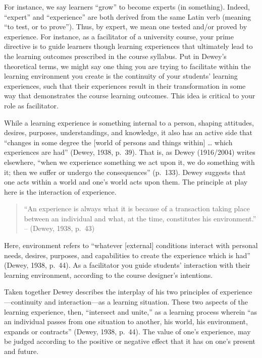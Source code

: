 \documentclass[
]{book}
\begin{document}
For instance, we say learners ``grow'' to become experts (in something). Indeed, ``expert'' and ``experience'' are both derived from the same Latin verb (meaning ``to test, or to prove''). Thus, by expert, we mean one tested and/or proved by experience. For instance, as a facilitator of a university course, your prime directive is to guide learners though learning experiences that ultimately lead to the learning outcomes prescribed in the course syllabus. Put in Dewey's theoretical terms, we might say one thing you are trying to facilitate within the learning environment you create is the continuity of your students' learning experiences, such that their experiences result in their transformation in some way that demonstrates the course learning outcomes. This idea is critical to your role as facilitator.

While a learning experience is something internal to a person, shaping attitudes, desires, purposes, understandings, and knowledge, it also has an active side that ``changes in some degree the {[}world of persons and things within{]} \ldots{} which experiences are had'' (Dewey, 1938, p.~39). That is, as Dewey (1916/2004) writes elsewhere, ``when we experience something we act upon it, we do something with it; then we suffer or undergo the consequences'' (p.~133). Dewey suggests that one acts within a world and one's world acts upon them. The principle at play here is the interaction of experience.

\begin{quote}
``An experience is always what it is because of a transaction taking place between an individual and what, at the time, constitutes his environment.'' -- (Dewey, 1938, p.~43)
\end{quote}

Here, environment refers to ``whatever {[}external{]} conditions interact with personal needs, desires, purposes, and capabilities to create the experience which is had'' (Dewey, 1938, p.~44). As a facilitator you guide students' interaction with their learning environment, according to the course designer's intentions.

Taken together Dewey describes the interplay of his two principles of experience---continuity and interaction---as a learning situation. These two aspects of the learning experience, then, ``intersect and unite,'' as a learning process wherein ``as an individual passes from one situation to another, his world, his environment, expands or contracts'' (Dewey, 1938, p.~44). The value of one's experience, may be judged according to the positive or negative effect that it has on one's present and future.
\end{document}
